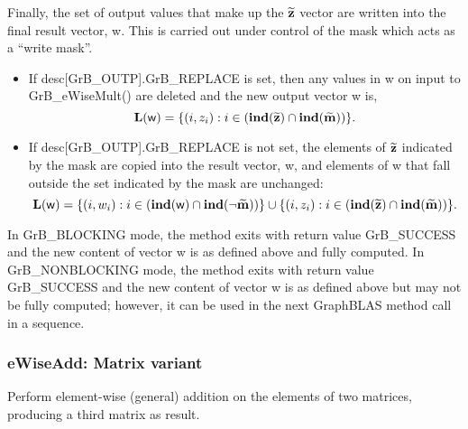 Finally, the set of output values that make up the ${\bf \widetilde{z}}$ 
vector are written into the final result vector, {\sf w}. 
This is carried out under control of the mask which acts as a ``write mask''.
\begin{itemize}
\item If {\sf desc[GrB\_OUTP].GrB\_REPLACE} is set, then any values in {\sf w} 
on input to {\sf GrB\_eWiseMult()} are deleted and the new output vector {\sf w} is,
\[ \bold{L}({\sf w}) = \{(i,z_{i}) : i \in (\bold{ind}({\bf \widetilde{z}}) 
\cap \bold{ind}({\bf \widetilde{m}})) \}. \]

\item If {\sf desc[GrB\_OUTP].GrB\_REPLACE} is not set, the elements of 
${\bf \widetilde{z}}$ indicated by 
the mask are copied into the result vector, {\sf w}, and elements of 
{\sf w} that fall outside the set indicated by the mask are unchanged:
\[ \bold{L}({\sf w}) = \{(i,w_{i}) : i \in (\bold{ind}({\sf w}) 
\cap \bold{ind}(\neg {\bf \widetilde{m}})) \} \cup \{(i,z_{i}) : i \in 
(\bold{ind}({\bf \widetilde{z}}) \cap \bold{ind}({\bf \widetilde{m}})) \}. \]
\end{itemize}

In {\sf GrB\_BLOCKING} mode, the method exits with return value 
{\sf GrB\_SUCCESS} and the new content of vector {\sf w} is as defined above
and fully computed.  
In {\sf GrB\_NONBLOCKING} mode, the method exits with return value 
{\sf GrB\_SUCCESS} and the new content of vector {\sf w} is as defined above 
but may not be fully computed; however, it can be used in the next GraphBLAS 
method call in a sequence.



\subsubsection{{\sf eWiseAdd}: Matrix variant}

Perform element-wise (general) addition on the elements of two matrices,
producing a third matrix as result.

\paragraph{\syntax}


